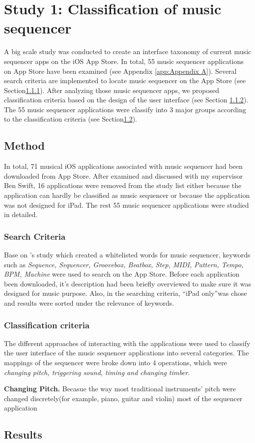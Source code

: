 \chapter{Study 1: Classification of music sequencer}
\label{ch: chapter 3}

A big scale study was conducted to create an interface taxonomy of current music sequencer apps on the iOS App Store. In total, 55 music sequencer applications on App Store have been examined (see Appendix \ref{app:Appendix A}). Several search criteria are implemented to locate music sequencer on the App Store (see Section\ref{subsec: search criteria}). After analyzing those music sequencer apps, we proposed classification criteria based on the design of the user interface (see Section \ref{sec: classify criteria}). The 55 music sequencer applications were classify into 3 major groups according to the classification criteria (see Section\ref{sec: result}).

\section{Method}
\label{sec:method}

In total, 71 musical iOS applications associated with music sequencer had been downloaded from App Store. After examined and discussed with my supervisor Ben Swift, 16 applications were removed from the study list either because the application can hardly be classified as music sequencer or because the application was not designed for iPad. The rest 55 music sequencer applications were studied in detailed.

\subsection{Search Criteria}
\label{subsec: search criteria}

Base on \citeauthor{Reference13}'s study which created a whitelisted words for music sequencer, keywords such as \textit{Sequence, Sequencer, Groovebox, Beatbox, Step, MIDI, Pattern, Tempo, BPM, Machine} were used to search on the App Store. Before each application been downloaded, it's description had been briefly overviewed to make sure it was designed for music purpose. Also, in the searching criteria, \textquotedblleft{iPad only}\textquotedblright was chose and results were sorted under the relevance of keywords.

\subsection{Classification criteria}
\label{sec: classify criteria}
The different approaches of interacting with the applications were used to classify the user interface of the music sequencer applications into several categories. The mappings of the sequencer were broke down into 4 operations,
which were \textit{changing pitch, triggering sound, timing and changing timber}.

\textbf{Changing Pitch.} Becasue the way most traditional instruments' pitch were changed discretely(for example, piano, guitar and violin) most of the sequencer application  


\section{Results}
\label{sec: result}
